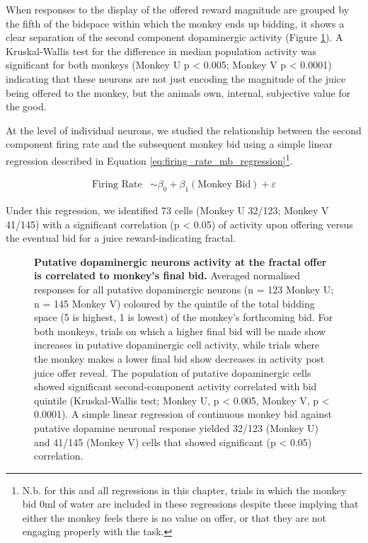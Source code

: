 When responses to the display of the offered reward magnitude are grouped by the fifth of the bidspace within which the monkey ends up bidding, it shows a clear separation of the second component dopaminergic activity (Figure \ref{fig:fractal_display_quintiles}). A Kruskal-Wallis test for the difference in median population activity was significant for both monkeys (Monkey U p < 0.005; Monkey V p < 0.0001) indicating that these neurons are not just encoding the magnitude of the juice being offered to the monkey, but the animals own, internal, subjective value for the good.

At the level of individual neurons, we studied the relationship between the second component firing rate and the subsequent monkey bid using a simple linear regression described in Equation \ref{eq:firing_rate_mb_regression}\footnote{N.b. for this and all regressions in this chapter, trials in which the monkey bid 0ml of water are included in these regressions despite these implying that either the monkey feels there is no value on offer, or that they are not engaging properly with the task.}.

\begin{align}
\text{Firing Rate} &\sim \beta_0 + \beta_1(\text{Monkey Bid}) + \varepsilon \label{eq:firing_rate_mb_regression}
\end{align}

Under this regression, we identified 73 cells (Monkey U 32/123; Monkey V 41/145) with a significant correlation (p < 0.05) of activity upon offering versus the eventual bid for a juice reward-indicating fractal.

\begin{figure}[htbp!] 
\centering    

\caption[Putative dopaminergic neurons activity at the fractal offer is correlated to monkey's final bid.]{\textbf{Putative dopaminergic neurons activity at the fractal offer is correlated to monkey's final bid.} Averaged normalised responses for all putative dopaminergic neurons (n = 123 Monkey U; n = 145 Monkey V) coloured by the quintile of the total bidding space (5 is highest, 1 is lowest) of the monkey's forthcoming bid. For both monkeys, trials on which a higher final bid will be made show increases in putative dopaminergic cell activity, while trials where the monkey makes a lower final bid show decreases in activity post juice offer reveal. The population of putative dopaminergic cells showed significant second-component activity correlated with bid quintile (Kruskal-Wallis test; Monkey U, p < 0.005, Monkey V, p < 0.0001). A simple linear regression of continuous monkey bid against putative dopamine neuronal response yielded 32/123 (Monkey U) and 41/145 (Monkey V) cells that showed significant (p < 0.05) correlation.}
\label{fig:fractal_display_quintiles}
\end{figure}

